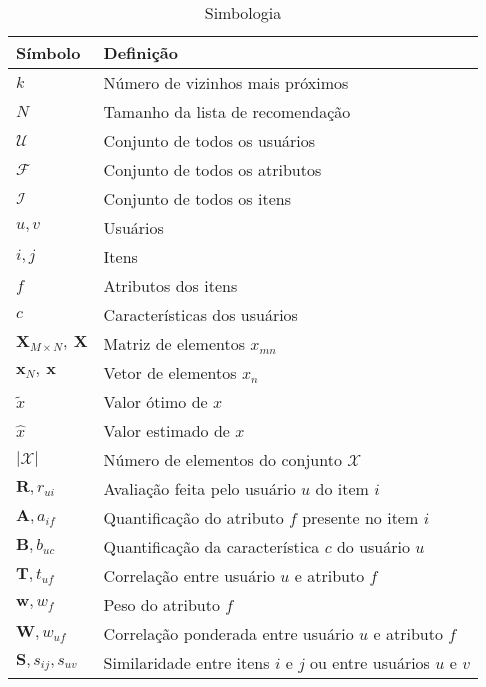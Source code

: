 \begin{table}[hp]
\begin{center}
    \caption{Simbologia}
    \label{tab:simbologia}
    \begin{tabular}{ | l | l | }
    \hline
    \textbf{Símbolo} & \textbf{Definição} \\ \hline \hline
    $k$ & Número de vizinhos mais próximos \\ \hline
    $N$ & Tamanho da lista de recomendação \\ \hline \hline
    $\mathcal{U}$ & Conjunto de todos os usuários \\ \hline
    $\mathcal{F}$ & Conjunto  de todos os atributos \\ \hline
    $\mathcal{I}$ & Conjunto de todos os itens \\ \hline \hline
    $u, v$ & Usuários \\ \hline
    $i, j$ & Itens \\ \hline
    $f$ & Atributos dos itens \\ \hline
    $c $ & Características dos usuários \\ \hline \hline
    $\mathbf{X}_{M \times N},~\mathbf{X}$ & Matriz de elementos $x_{mn}$ \\ \hline
    $\mathbf{x}_{N},~\mathbf{x}$ & Vetor de elementos $x_{n}$ \\ \hline
    $\tilde{x}$ & Valor ótimo de $x$ \\ \hline    
    $\hat{x}$ & Valor estimado de $x$ \\ \hline    
    $|\mathcal{X}|$ & Número de elementos do conjunto $\mathcal{X}$ \\ \hline \hline
    $\mathbf{R}, r_{ui}$ & Avaliação feita pelo usuário $u$ do item $i$ \\ \hline
    $\mathbf{A}, a_{if}$ & Quantificação do atributo $f$ presente no item $i$ \\ \hline
    $\mathbf{B}, b_{uc}$ & Quantificação da característica $c$ do usuário $u$ \\ \hline    
    $\mathbf{T}, t_{uf}$ & Correlação entre usuário $u$ e atributo $f$ \\ \hline
    $\mathbf{w}, w_{f}$ & Peso do atributo $f$ \\ \hline
    $\mathbf{W}, w_{uf}$ & Correlação ponderada entre usuário $u$ e atributo $f$ \\ \hline
    $\mathbf{S}, s_{ij}, s_{uv}$ & Similaridade entre itens $i$ e $j$ ou entre usuários $u$ e $v$\\ \hline
    \end{tabular}
\end{center}
\end{table}


